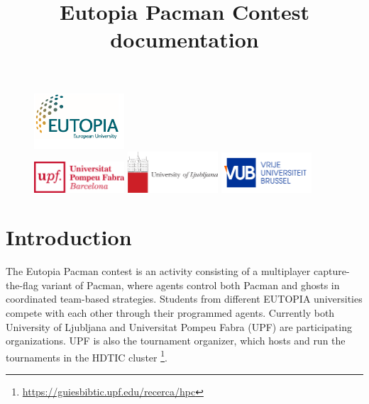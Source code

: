 \documentclass[11pt]{article}
\title{Eutopia Pacman Contest documentation}
\date{}
\begin{document}
\maketitle


\begin{figure}[h!]
    \center 
    \includegraphics[width = 0.3\textwidth]{eutopia.png}\\
    \includegraphics[width = 0.3\textwidth]{UPFt_rgb.png}
    \includegraphics[width = 0.3\textwidth]{University-of-Ljubljana-logo.png} 
    \includegraphics[width = 0.3\textwidth]{Vrije_Universiteit_Brussel.png}
\end{figure}

\tableofcontents

\newpage
\section{Introduction}

The Eutopia Pacman contest is an activity consisting of a multiplayer capture-the-flag variant of Pacman, where agents control both Pacman and ghosts in coordinated team-based strategies. Students from different EUTOPIA universities compete with each other through their programmed agents.  Currently both University of Ljubljana and Universitat Pompeu Fabra (UPF) are participating organizations. 
UPF is also the tournament organizer, which hosts and run the tournaments in the HDTIC cluster
\footnote{\url{https://guiesbibtic.upf.edu/recerca/hpc}}.
\end{document}
